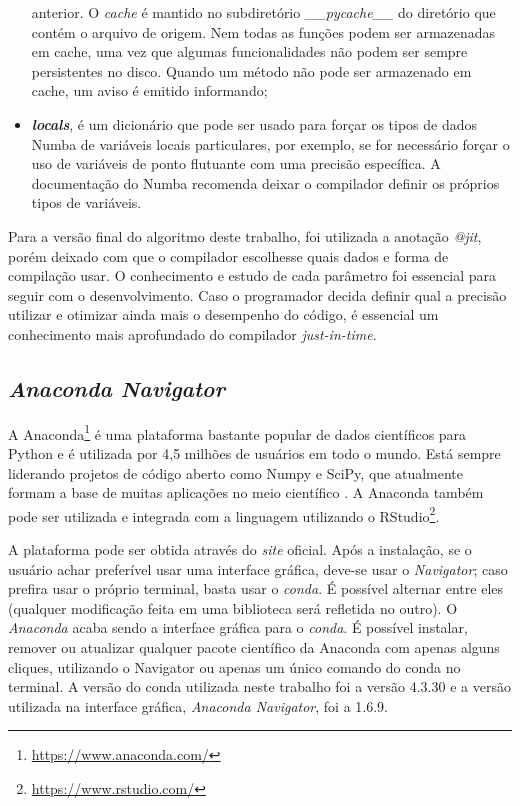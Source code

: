 \documentclass[
	12pt,				%
	twoside,			%
	a4paper,			%
	english,			%
	french,				%
	spanish,			%
	brazil				%
	]{abntex2}
\begin{document}
\begin{itemize}
  anterior. O \emph{cache} é mantido no subdiretório
  \emph{\_\_pycache\_\_} do diretório que contém o arquivo de origem.
  Nem todas as funções podem ser armazenadas em cache, uma vez que
  algumas funcionalidades não podem ser sempre persistentes no disco.
  Quando um método não pode ser armazenado em cache, um aviso é emitido
  informando;
\item
  \textbf{\emph{locals}}, é um dicionário que pode ser usado para forçar
  os tipos de dados Numba de variáveis locais particulares, por exemplo,
  se for necessário forçar o uso de variáveis de ponto flutuante com uma
  precisão específica. A documentação do Numba recomenda deixar o
  compilador definir os próprios tipos de variáveis.
\end{itemize}

Para a versão final do algoritmo deste trabalho, foi utilizada a
anotação \emph{@jit}, porém deixado com que o compilador escolhesse
quais dados e forma de compilação usar. O conhecimento e estudo de cada
parâmetro foi essencial para seguir com o desenvolvimento. Caso o
programador decida definir qual a precisão utilizar e otimizar ainda
mais o desempenho do código, é essencial um conhecimento mais
aprofundado do compilador \emph{just-in-time}.

\subsection{\texorpdfstring{\emph{Anaconda
Navigator}}{Anaconda Navigator}}\label{anaconda-navigator}

A Anaconda\footnote{\url{https://www.anaconda.com/}} é uma plataforma
bastante popular de dados científicos para Python e é utilizada por 4,5
milhões de usuários em todo o mundo. Está sempre liderando projetos de
código aberto como Numpy e SciPy, que atualmente formam a base de muitas
aplicações no meio científico \cite{ANACONDA}. A Anaconda também pode
ser utilizada e integrada com a linguagem utilizando o RStudio\footnote{\url{https://www.rstudio.com/}}.

A plataforma pode ser obtida através do \emph{site} oficial. Após a
instalação, se o usuário achar preferível usar uma interface gráfica,
deve-se usar o \emph{Navigator}; caso prefira usar o próprio terminal,
basta usar o \emph{conda}. É possível alternar entre eles (qualquer
modificação feita em uma biblioteca será refletida no outro). O
\emph{Anaconda} acaba sendo a interface gráfica para o \emph{conda}. É
possível instalar, remover ou atualizar qualquer pacote científico da
Anaconda com apenas alguns cliques, utilizando o Navigator ou apenas um
único comando do conda no terminal. A versão do conda utilizada neste
trabalho foi a versão 4.3.30 e a versão utilizada na interface gráfica,
\emph{Anaconda Navigator}, foi a 1.6.9.
\end{document}
